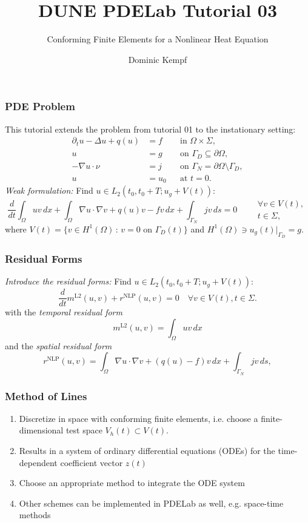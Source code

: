 \documentclass[aspectratio=169,11pt]{beamer}
\title{DUNE PDELab Tutorial 03}
\subtitle{Conforming Finite Elements for a Nonlinear Heat Equation}
\author{Dominic Kempf}
\institute[]
{
  Scientific Software Center\\
  Heidelberg University
}
\theoremstyle{definition}
\begin{document}


\begin{frame}
\frametitle{PDE Problem}
This tutorial extends the problem from tutorial 01 to the instationary setting:
\begin{align*}
\partial_t u -\Delta u + q(u) &= f &&\text{in $\Omega\times\Sigma$},\\
u &= g &&\text{on $\Gamma_D\subseteq\partial\Omega$},\\
-\nabla u\cdot \nu &= j &&\text{on $\Gamma_N=\partial\Omega\setminus\Gamma_D$},\\
u &= u_0 &&\text{at $t=0$}.
\end{align*}
\textit{Weak formulation:} Find $u\in L_2(t_0,t_0+T;u_g+V(t))$:
\begin{equation*}
\frac{d}{dt} \int_\Omega u v \,dx+ \int_\Omega \nabla u \cdot \nabla v
+ q(u) v - f v \, dx + \int_{\Gamma_N} jv \, ds = 0 \qquad
\begin{array}{l}
\forall v \in V(t),\\
t \in \Sigma,
\end{array}
\end{equation*}
where $V(t) = \{v\in H^1(\Omega)\,:\, \text{$v=0$ on $\Gamma_D(t)$}\}$
and $H^1(\Omega)\ni u_g(t)|_{\Gamma_D}=g$.
\end{frame}

\begin{frame}
\frametitle{Residual Forms}
\textit{Introduce the residual forms:} Find $u\in L_2(t_0,t_0+T;u_g+V(t))$:
\begin{equation*}
\frac{d}{dt} m^{\text{L2}}(u,v) + r^{\text{NLP}}(u,v) = 0 \quad \forall v \in V(t), t \in \Sigma.
\end{equation*}
with the \textit{temporal residual form}
\begin{equation*}
m^{\text{L2}}(u,v) = \int_\Omega u v \,dx
\end{equation*}
and the \textit{spatial residual form}
\begin{equation*}
r^{\text{NLP}}(u,v) = \int_\Omega \nabla u \cdot \nabla v + (q(u)-f)v\,dx + \int_{\Gamma_N} jv\,ds ,
\end{equation*}
\end{frame}

\begin{frame}
\frametitle{Method of Lines}
\begin{enumerate}[1)]
\item Discretize in space with conforming finite elements, i.e. choose a
finite-dimensional test space $V_h(t)\subset V(t)$.
\item Results in a system of ordinary differential equations (ODEs) for the time-dependent
coefficient vector $z(t)$
\item Choose an appropriate method to integrate the ODE system
\item Other schemes can be implemented in PDELab as well, e.g. space-time methods
\end{enumerate}
\end{frame}
\end{document}

